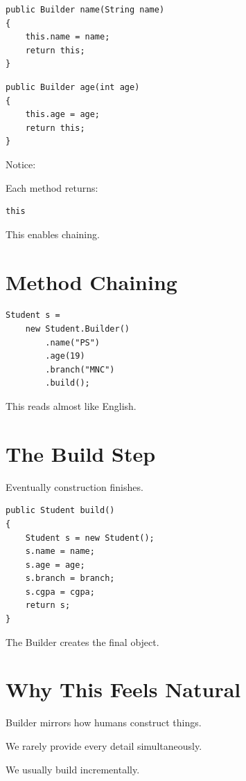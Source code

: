 \documentclass[11pt,a4paper]{book}
\begin{document}
\begin{verbatim}
public Builder name(String name)
{
    this.name = name;
    return this;
}
\end{verbatim}

\begin{verbatim}
public Builder age(int age)
{
    this.age = age;
    return this;
}
\end{verbatim}

Notice:

Each method returns:

\begin{verbatim}
this
\end{verbatim}

This enables chaining.


\section{Method Chaining}

\begin{verbatim}
Student s =
    new Student.Builder()
        .name("PS")
        .age(19)
        .branch("MNC")
        .build();
\end{verbatim}

This reads almost like English.


\section{The Build Step}

Eventually construction finishes.

\begin{verbatim}
public Student build()
{
    Student s = new Student();
    s.name = name;
    s.age = age;
    s.branch = branch;
    s.cgpa = cgpa;
    return s;
}
\end{verbatim}

The Builder creates the final object.


\section{Why This Feels Natural}

\begin{idea}

Builder mirrors how humans construct things.

We rarely provide every detail simultaneously.

We usually build incrementally.

\end{idea}
\end{document}
